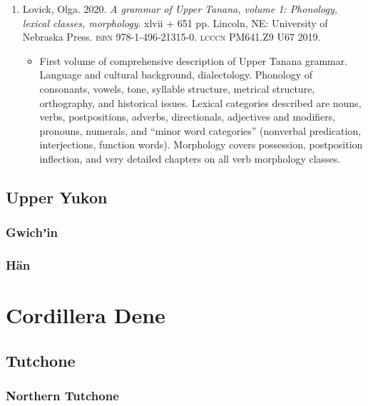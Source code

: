 \documentclass[12pt,letterpaper,oneside,article]{memoir}
\begin{document}
\begin{enumerate}
\item	Lovick, Olga.
	2020.
	\textit{A grammar of Upper Tanana, volume 1: Phonology, lexical classes, morphology}.
	xlvii + 651 pp.
	Lincoln, NE: University of Nebraska Press.
	\textsc{isbn} 978-1-496-21315-0.
	\textsc{lcccn} PM641.Z9 U67 2019.
	\begin{itemize}
	\item	First volume of comprehensive description of Upper Tanana grammar.
		Language and cultural background, dialectology.
		Phonology of consonants, vowels, tone, syllable structure, metrical
		structure, orthography, and historical issues.
		Lexical categories described are nouns, verbs, postpositions, adverbs,
		directionals, adjectives and modifiers, pronouns, numerals, and “minor
		word categories” (nonverbal predication, interjections, function words).
		Morphology covers possession, postposition inflection, and very detailed
		chapters on all verb morphology classes.
	\end{itemize}
\end{enumerate}


\subsection{Upper Yukon}\label{sec:dene-cord-upper}

\subsubsection{Gwichʼin}\label{sec:gwichin}

\subsubsection{Hän}\label{sec:han}

\section{Cordillera Dene}\label{sec:dene-cord}

\subsection{Tutchone}\label{sec:dene-cord-tutchone}

\subsubsection{Northern Tutchone}\label{sec:ntutchone}
\end{document}
